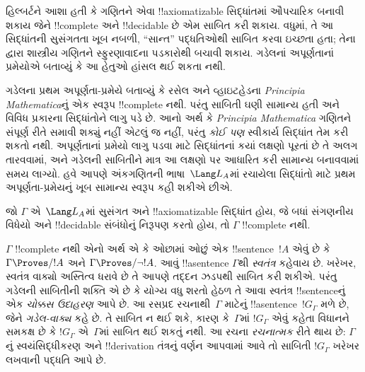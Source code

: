 \documentclass[../../../include/open-logic-section]{subfiles}
\begin{document}


હિલ્બર્ટને આશા હતી કે ગણિતને એવા
!!{axiomatizable} સિદ્ધાંતમાં ઔપચારિક બનાવી
શકાય જેને !!{complete} અને !!{decidable}
છે એમ સાબિત કરી શકાય. વધુમાં, તે આ
સિદ્ધાંતની સુસંગતતા ખૂબ નબળી, ``સાન્ત''
પદ્ધતિઓથી સાબિત કરવા ઇચ્છતા હતા;
તેના દ્વારા શાસ્ત્રીય ગણિતને સ્ફુરણાવાદના
પડકારોથી બચાવી શકાય. ગડેલનાં અપૂર્ણતાનાં
પ્રમેયોએ બતાવ્યું કે આ હેતુઓ હાંસલ થઈ
શકતા નથી.

ગડેલના પ્રથમ અપૂર્ણતા-પ્રમેયે બતાવ્યું કે
રસેલ અને વ્હાઇટહેડના \emph{Principia
Mathematica}નું એક સ્વરૂપ !!{complete}
નથી. પરંતુ સાબિતી ઘણી સામાન્ય હતી અને
વિવિધ પ્રકારના સિદ્ધાંતોને લાગુ પડે છે. આનો
અર્થ કે \emph{Principia Mathematica}
ગણિતને સંપૂર્ણ રીતે સમાવી શક્યું નહીં એટલું
જ નહીં, પરંતુ \emph{કોઈ પણ} સ્વીકાર્ય
સિદ્ધાંત તેમ કરી શકતો નથી. અપૂર્ણતાનાં
પ્રમેયો લાગુ પડવા માટે સિદ્ધાંતનાં કયાં
લક્ષણો પૂરતાં છે તે અલગ તારવવામાં, અને
ગડેલની સાબિતીને માત્ર આ લક્ષણો પર આધારિત
કરી સામાન્ય બનાવવામાં સમય લાગ્યો.
હવે આપણે અંકગણિતની ભાષા~$\Lang L_A$માં
રચાયેલા સિદ્ધાંતો માટે પ્રથમ અપૂર્ણતા-પ્રમેયનું
ખૂબ સામાન્ય સ્વરૂપ કહી શકીએ છીએ.

\begin{thm}
જો $\Gamma$ એ~$\Lang L_A$માં સુસંગત
અને !!{axiomatizable} સિદ્ધાંત હોય, જે બધાં
સંગણનીય વિધેયો અને !!{decidable} સંબંધોનું
નિરૂપણ કરતો હોય, તો $\Gamma$
!!{complete} નથી.
\end{thm}

$\Gamma$ !!{complete} નથી એનો અર્થ એ
કે ઓછામાં ઓછું એક !!{sentence}~$!A$ એવું
છે કે $\Gamma \Proves/ !A$ અને
$\Gamma \Proves/ \lnot !A$. આવું
!!a{sentence} $\Gamma$થી \emph{સ્વતંત્ર}
કહેવાય છે. ખરેખર, સ્વતંત્ર વાક્યો અસ્તિત્વ
ધરાવે છે તે આપણે તદ્દન ઝડપથી સાબિત કરી
શકીએ. પરંતુ ગડેલની સાબિતીની
શક્તિ એ છે કે યોગ્ય વધુ શરતો હેઠળ તે આવા સ્વતંત્ર
!!{sentence}નું એક \emph{ચોક્કસ ઉદાહરણ} આપે છે. આ
રસપ્રદ રચનાથી~$\Gamma$ માટેનું
!!a{sentence}~$!G_\Gamma$ મળે છે, જેને
\emph{ગડેલ-વાક્ય} કહે છે. તે સાબિત ન થઈ
શકે, કારણ કે~$\Gamma$માં $!G_\Gamma$
એવું કહેતા વિધાનને સમકક્ષ છે કે
$!G_\Gamma$ એ~$\Gamma$માં સાબિત
થઈ શકતું નથી. આ રચના \emph{રચનાત્મક}
રીતે થાય છે: $\Gamma$નું સ્વયંસિદ્ધીકરણ
અને !!{derivation} તંત્રનું વર્ણન આપવામાં
આવે તો સાબિતી $!G_\Gamma$ ખરેખર લખવાની
પદ્ધતિ આપે છે.
\end{document}
